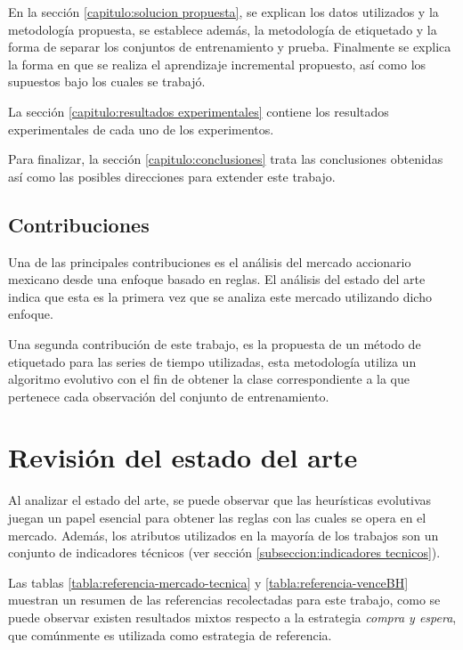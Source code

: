 \documentclass[12pt]{report}
\theoremstyle{break}
\theoremstyle{break}
\begin{document}
En la sección \ref{capitulo:solucion propuesta}, se explican los datos utilizados y la metodología propuesta, se establece además, la metodología de etiquetado y la forma de separar los conjuntos de entrenamiento y prueba. Finalmente se explica la forma en que se realiza el aprendizaje incremental propuesto, así como los supuestos bajo los cuales se trabajó.

La sección \ref{capitulo:resultados experimentales} contiene los resultados experimentales de cada uno de los experimentos.

Para finalizar, la sección \ref{capitulo:conclusiones} trata las conclusiones obtenidas así como las posibles direcciones para extender este trabajo.

\section{Contribuciones}
\label{seccion:contribuciones}
Una de las principales contribuciones es el análisis del mercado accionario mexicano desde una enfoque basado en reglas. El análisis del estado del arte indica que esta es la primera vez que se analiza este mercado utilizando dicho enfoque.

Una segunda contribución de este trabajo, es la propuesta de un método de etiquetado para las series de tiempo utilizadas, esta metodología utiliza un algoritmo evolutivo con el fin de obtener la clase correspondiente a la que pertenece cada observación del conjunto de entrenamiento.

\chapter[Capítulo \thechapter: Revisión del estado del arte]{Revisión del estado del arte}
\label{capitulo:antecedentes}
Al analizar el estado del arte, se puede observar que las heurísticas evolutivas juegan un papel esencial para obtener las reglas con las cuales se opera en el mercado. Además, los atributos utilizados en la mayoría de los trabajos son un conjunto de indicadores técnicos (ver sección \ref{subseccion:indicadores tecnicos}).

Las tablas \ref{tabla:referencia-mercado-tecnica} y \ref{tabla:referencia-venceBH} muestran un resumen de las referencias recolectadas para este trabajo, como se puede observar existen resultados mixtos respecto a la estrategia \textit{compra y espera}, que comúnmente es utilizada como estrategia de referencia.
\end{document}
